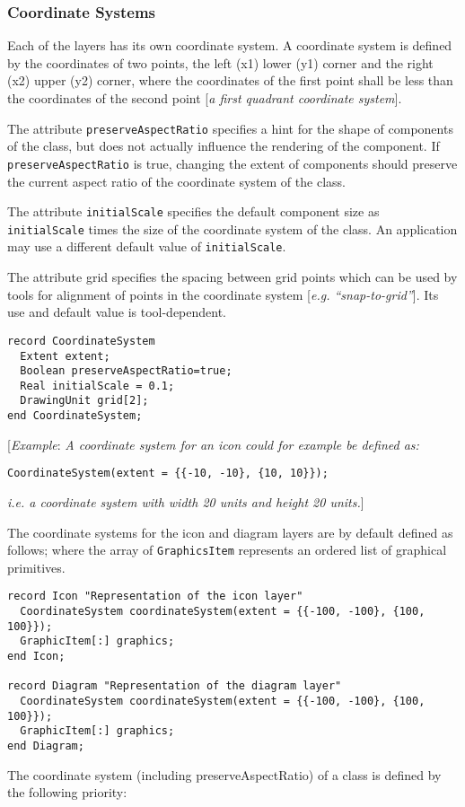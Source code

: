 \subsubsection{Coordinate Systems}

Each of the layers has its own coordinate system. A coordinate system is
defined by the coordinates of two points, the left (x1) lower (y1)
corner and the right (x2) upper (y2) corner, where the coordinates of
the first point shall be less than the coordinates of the second point
{[}\emph{a first quadrant coordinate system}{]}.

The attribute \lstinline!preserveAspectRatio! specifies a hint for the shape of
components of the class, but does not actually influence the rendering of the component.
If \lstinline!preserveAspectRatio! is true, changing the
extent of components should preserve the current aspect ratio of the coordinate
system of the class.

The attribute \lstinline!initialScale! specifies the default component size as
\lstinline!initialScale! times the size of the coordinate system of the class. An
application may use a different default value of \lstinline!initialScale!.

The attribute grid specifies the spacing between grid points which can
be used by tools for alignment of points in the coordinate system
{[}\emph{e.g. ``snap-to-grid''}{]}. Its use and default value is
tool-dependent.

\begin{lstlisting}[language=modelica]
record CoordinateSystem
  Extent extent;
  Boolean preserveAspectRatio=true;
  Real initialScale = 0.1;
  DrawingUnit grid[2];
end CoordinateSystem;
\end{lstlisting}
{[}\emph{Example}: \emph{A coordinate system for an icon could for
example be defined as:}
\begin{lstlisting}[language=modelica]
CoordinateSystem(extent = {{-10, -10}, {10, 10}});
\end{lstlisting}
\emph{i.e. a coordinate system with width 20 units and height 20
units.}{]}

The coordinate systems for the icon and diagram layers are by default
defined as follows; where the array of \lstinline!GraphicsItem! represents an
ordered list of graphical primitives.

\begin{lstlisting}[language=modelica]
record Icon "Representation of the icon layer"
  CoordinateSystem coordinateSystem(extent = {{-100, -100}, {100, 100}});
  GraphicItem[:] graphics;
end Icon;

record Diagram "Representation of the diagram layer"
  CoordinateSystem coordinateSystem(extent = {{-100, -100}, {100, 100}});
  GraphicItem[:] graphics;
end Diagram;
\end{lstlisting}
The coordinate system (including preserveAspectRatio) of a class is
defined by the following priority:

